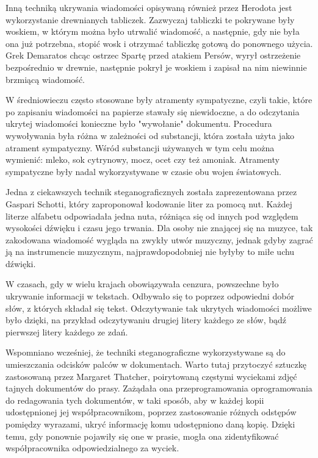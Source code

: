 \documentclass[a4paper, twoside, 12pt]{report}
\begin{document}
        Inną techniką ukrywania wiadomości opisywaną również przez Herodota
        jest wykorzystanie drewnianych tabliczek. Zazwyczaj tabliczki te pokrywane
        były woskiem, w którym można było utrwalić wiadomość, a następnie, gdy
        nie była ona już potrzebna, stopić wosk i otrzymać tabliczkę gotową do
        ponownego użycia. Grek Demaratos chcąc ostrzec Spartę przed atakiem Persów,
        wyrył ostrzeżenie bezpośrednio w drewnie, następnie pokrył je woskiem
        i zapisał na nim niewinnie brzmiącą wiadomość.

        W średniowieczu często stosowane były atramenty sympatyczne, czyli takie,
        które po zapisaniu wiadomości na papierze stawały się niewidoczne, a do
        odczytania ukrytej wiadomości konieczne było "wywołanie" dokumentu. Procedura
        wywoływania była różna w zależności od substancji, która została użyta jako
        atrament sympatyczny. Wśród substancji używanych w tym celu można wymienić:
        mleko, sok cytrynowy, mocz, ocet czy też amoniak. Atramenty sympatyczne
        były nadal wykorzystywane w czasie obu wojen światowych.

        Jedna z ciekawszych technik steganograficznych została zaprezentowana przez
        Gaspari Schotti\cite{NUTYSTEGANOGRAFIA},
        który zaproponował kodowanie liter za pomocą nut. Każdej literze alfabetu
        odpowiadała jedna nuta, różniąca się od innych pod względem wysokości
        dźwięku i czasu jego trwania. Dla osoby nie znającej się na muzyce, tak zakodowana
        wiadomość wygląda na zwykły utwór muzyczny, jednak gdyby zagrać ją na instrumencie
        muzycznym, najprawdopodobniej nie byłyby to miłe uchu dźwięki.

        W czasach, gdy w wielu krajach obowiązywała cenzura, powszechne było ukrywanie
        informacji w tekstach. Odbywało się to poprzez odpowiedni dobór słów,
        z których składał się tekst. Odczytywanie tak ukrytych wiadomości możliwe było
        dzięki, na przykład odczytywaniu drugiej litery każdego ze słów, bądź pierwszej
        litery każdego ze zdań.

        Wspomniano wcześniej, że techniki steganograficzne wykorzystywane są do umieszczania
        odcisków palców w dokumentach. Warto tutaj przytoczyć sztuczkę zastosowaną
        przez Margaret Thatcher, poirytowaną częstymi wyciekami zdjęć tajnych dokumentów
        do prasy. Zażądała ona przeprogramowania oprogramowania do redagowania tych
        dokumentów, w taki sposób, aby w każdej kopii udostępnionej jej współpracownikom,
        poprzez zastosowanie różnych odstępów pomiędzy wyrazami, ukryć informację
        komu udostępniono daną kopię. Dzięki temu, gdy ponownie pojawiły się one w
        prasie, mogła ona zidentyfikować współpracownika odpowiedzialnego za wyciek.\cite{DIGITALWATERMARKING}
\end{document}
